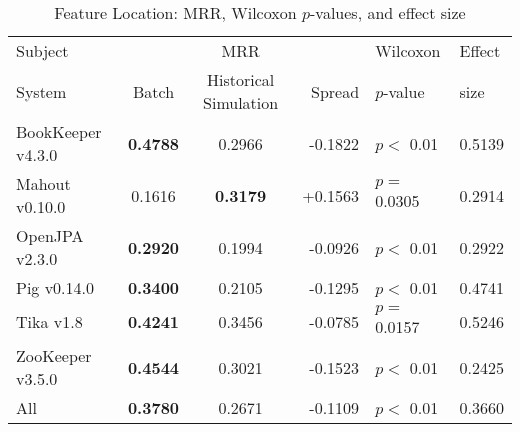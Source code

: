 \begin{table}[t]
\centering
\caption{Feature Location: MRR, Wilcoxon $p$-values, and effect size}
\begin{tabular}{l|ccr|ll}
\toprule
Subject & & MRR & & Wilcoxon & Effect \\
System  &  Batch & Historical Simulation & Spread & $p$-value & size \\
\midrule
BookKeeper v4.3.0 & {\bf 0.4788 } & 0.2966 & -0.1822 & $p < $ 0.01 & 0.5139 \\
Mahout v0.10.0 & 0.1616 & {\bf 0.3179 } & +0.1563 & $p = $ 0.0305 & 0.2914 \\
OpenJPA v2.3.0 & {\bf 0.2920 } & 0.1994 & -0.0926 & $p < $ 0.01 & 0.2922 \\
Pig v0.14.0 & {\bf 0.3400 } & 0.2105 & -0.1295 & $p < $ 0.01 & 0.4741 \\
Tika v1.8 & {\bf 0.4241 } & 0.3456 & -0.0785 & $p = $ 0.0157 & 0.5246 \\
ZooKeeper v3.5.0 & {\bf 0.4544 } & 0.3021 & -0.1523 & $p < $ 0.01 & 0.2425 \\
\midrule
All & {\bf 0.3780 } & 0.2671 & -0.1109 & $p < $ 0.01 & 0.3660 \\
\bottomrule
\end{tabular}
\label{table:feature_location_rq2}
\end{table}
